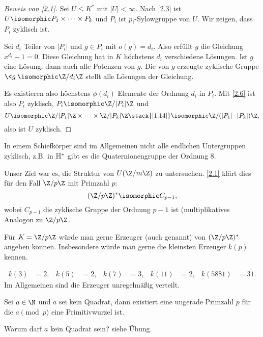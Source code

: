 \begin{proof}[Beweis von \ref{2.1}]
	Sei $U \le K^*$ mit $|U| < \infty$.
	Nach \ref{2.3} ist $U \isomorphic P_1 \times \dotsb \times P_k$ und $P_i$ ist $p_i$-Sylowgruppe von $U$.
	Wir zeigen, dass $P_i$ zyklisch ist.

	Sei $d_i$ Teiler von $|P_i|$ und $g \in P_i$ mit $o(g) = d_i$.
	Also erfüllt $g$ die Gleichung $x^{d_i} - 1 = 0$.
	Diese Gleichung hat in $K$ höchstens $d_i$ verschiedene Lösungen.
	Ist $g$ eine Lösung, dann auch alle Potenzen von $g$.
	Die von $g$ erzeugte zyklische Gruppe $\<g\> \isomorphic \Z / d_i \Z$ stellt alle Lösungen der Gleichung.

	Es existieren also höchstens $\phi(d_i)$ Elemente der Ordnung $d_i$ in $P_i$.
	Mit \ref{2.6} ist also $P_i$ zyklisch, $P_i \isomorphic \Z / |P_i| \Z$ und
	\[
		U \isomorphic
		\Z / |P_1| \Z \times \dotsb \times \Z / |P_k| \Z
		\stack{\ref{1.14}}\isomorphic
		\Z / (|P_1| \cdot |P_k|) \Z,
	\]
	also ist $U$ zyklisch.
\end{proof}
\begin{note}
	In einem Schiefkörper sind im Allgemeinen nicht alle endlichen Untergruppen zyklisch, z.B. in $\mathbb{H}^*$ gibt es die Quaternionengruppe der Ordnung $8$.
\end{note}

Unser Ziel war es, die Struktur von $U(\Z / m \Z)$ zu untersuchen.
\ref{2.1} klärt dies für den Fall $\Z / p\Z$ mit Primzahl $p$:
\[
	(\Z / p \Z)^* \isomorphic C_{p-1},
\]
wobei $C_{p-1}$ die zyklische Gruppe der Ordnung $p-1$ ist (multiplikatives Analogon zu $\Z / p \Z$.

\begin{nt*}
	Für $K = \Z / p\Z$ würde man gerne Erzeuger (auch  genannt) von $(\Z / p\Z)^*$ angeben können.
	Insbesondere würde man gerne die kleinsten Erzeuger $k(p)$ kennen.
\end{nt*}

\begin{ex*}
	\begin{align*}
		k(3) &= 2, &
		k(5) &= 2, &
		k(7) &= 3, &
		k(11) &= 2, &
		k(5881) &= 31.
	\end{align*}
	Im Allgemeinen sind die Erzeuger unregelmäßig verteilt.
\end{ex*}

\begin{conj}[E. Artin]
	Sei $a \in \N$ und $a$ sei kein Quadrat, dann existiert eine ungerade Primzahl $p$ für die $a \pmod p$ eine Primitivwurzel ist.
	\begin{note}
		Warum darf $a$ kein Quadrat sein?
		siehe Übung.
	\end{note}
\end{conj}

